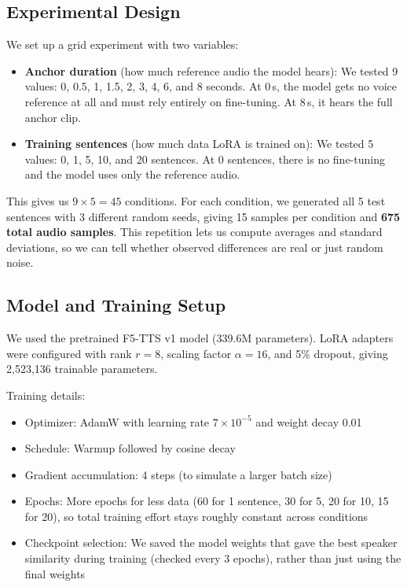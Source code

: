 \documentclass[11pt, a4paper]{article}
\begin{document}
\subsection{Experimental Design}

We set up a grid experiment with two variables:

\begin{itemize}[itemsep=4pt]
    \item \textbf{Anchor duration} (how much reference audio the model hears): We tested 9 values: 0, 0.5, 1, 1.5, 2, 3, 4, 6, and 8 seconds. At 0\,s, the model gets no voice reference at all and must rely entirely on fine-tuning. At 8\,s, it hears the full anchor clip.

    \item \textbf{Training sentences} (how much data LoRA is trained on): We tested 5 values: 0, 1, 5, 10, and 20 sentences. At 0 sentences, there is no fine-tuning and the model uses only the reference audio.
\end{itemize}

This gives us $9 \times 5 = 45$ conditions. For each condition, we generated all 5 test sentences with 3 different random seeds, giving 15 samples per condition and \textbf{675 total audio samples}. This repetition lets us compute averages and standard deviations, so we can tell whether observed differences are real or just random noise.

\subsection{Model and Training Setup}

We used the pretrained F5-TTS v1 model (339.6M parameters). LoRA adapters were configured with rank $r = 8$, scaling factor $\alpha = 16$, and 5\% dropout, giving 2,523,136 trainable parameters.

Training details:
\begin{itemize}[itemsep=2pt]
    \item Optimizer: AdamW with learning rate $7 \times 10^{-5}$ and weight decay 0.01
    \item Schedule: Warmup followed by cosine decay
    \item Gradient accumulation: 4 steps (to simulate a larger batch size)
    \item Epochs: More epochs for less data (60 for 1 sentence, 30 for 5, 20 for 10, 15 for 20), so total training effort stays roughly constant across conditions
    \item Checkpoint selection: We saved the model weights that gave the best speaker similarity during training (checked every 3 epochs), rather than just using the final weights
\end{itemize}
\end{document}
